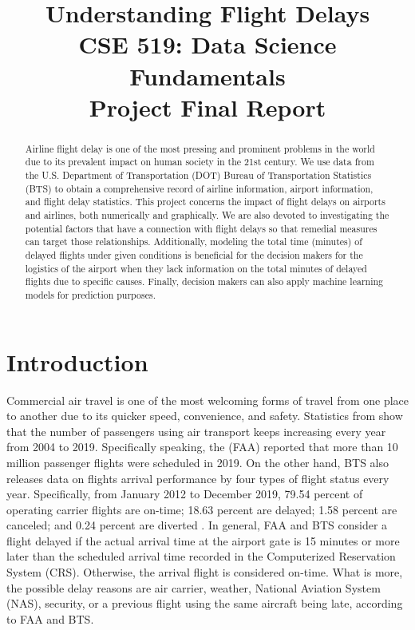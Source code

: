 \documentclass[11pt]{article}
\title{\textbf{Understanding Flight Delays}\\\textbf{CSE 519: Data Science Fundamentals}\\\textbf{Project Final Report}}
\begin{document}
\maketitle
\begin{abstract}
Airline flight delay is one of the most pressing and prominent problems in the world due to its prevalent impact on human society in the 21st century. We use data from the U.S. Department of Transportation (DOT) Bureau of Transportation Statistics (BTS) to obtain a comprehensive record of airline information, airport information, and flight delay statistics. This project concerns the impact of flight delays on airports and airlines, both numerically and graphically. We are also devoted to investigating the potential factors that have a connection with flight delays so that remedial measures can target those relationships. Additionally, modeling the total time (minutes) of delayed flights under given conditions is beneficial for the decision makers for the logistics of the airport when they lack information on the total minutes of delayed flights due to specific causes. Finally, decision makers can also apply machine learning models for prediction purposes.
\end{abstract}

\section{Introduction}\label{sec:intro}
Commercial air travel is one of the most welcoming forms of travel from one place to another due to its quicker speed, convenience, and safety. Statistics from \citet{web:statista} show that the number of passengers using air transport keeps increasing every year from 2004 to 2019. Specifically speaking, the \citet{web:faa1} (FAA) reported that more than 10 million passenger flights were scheduled in 2019. On the other hand, BTS also releases data on flights arrival performance by four types of flight status every year. Specifically, from January 2012 to December 2019, 79.54 percent of operating carrier flights are on-time; 18.63 percent are delayed; 1.58 percent are canceled; and 0.24 percent are diverted \citep{web:bts1}. In general, FAA and BTS consider a flight delayed if the actual arrival time at the airport gate is 15 minutes or more later than the scheduled arrival time recorded in the Computerized Reservation System (CRS). Otherwise, the arrival flight is considered on-time. What is more, the possible delay reasons are air carrier, weather, National Aviation System (NAS), security, or a previous flight using the same aircraft being late, according to FAA and BTS.
\end{document}
